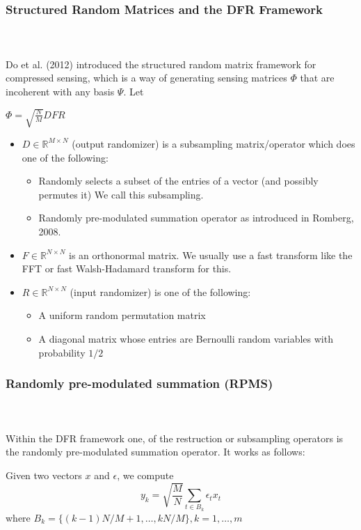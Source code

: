 


\begin{frame}[t]
	\frametitle{Structured Random Matrices and the DFR Framework}
	\framesubtitle{~~}  %

	Do et al. (2012) introduced the structured random matrix framework for compressed sensing,
	which is a way of generating sensing matrices $\Phi$ that are incoherent with any basis $\Psi$. Let 

	\centering
	$	\Phi = \sqrt{\frac{N}{M}}DFR$

	\begin{itemize}
	\item $D\in \mathbb{R}^{M\times N}$ (output randomizer) is a subsampling matrix/operator which does one of the following:
		\begin{itemize}
		\item Randomly selects a subset of the entries of a vector (and possibly permutes it) We call this subsampling.
		\item Randomly pre-modulated summation operator as introduced in Romberg, 2008.
		\end{itemize}
	\item $F\in\mathbb{R}^{N\times N}$ is an orthonormal matrix. We usually use a fast transform like the FFT or 
		fast Walsh-Hadamard transform for this.
	\item $R\in\mathbb{R}^{N\times N}$ (input randomizer) is one of the following:
		\begin{itemize}
			\item A uniform random permutation matrix
			\item A diagonal matrix whose entries are Bernoulli random variables with probability $1/2$
		\end{itemize}
	\end{itemize}

\end{frame}

\begin{frame}[t]
	\frametitle{Randomly pre-modulated summation (RPMS)}
	\framesubtitle{~~}  %
	
	Within the DFR framework one, of the restruction or subsampling operators is the
	randomly pre-modulated summation operator. It works as follows:

	Given two vectors $x$ and $\epsilon$, we compute
	\begin{equation}
		y_k = \sqrt{\frac{M}{N}}\sum_{t\in B_k}\epsilon_t x_t
	\end{equation}
	where
	$B_k = \{(k-1)N/M + 1, \ldots, kN/M  \}, k = 1,\ldots,m$

\end{frame}

